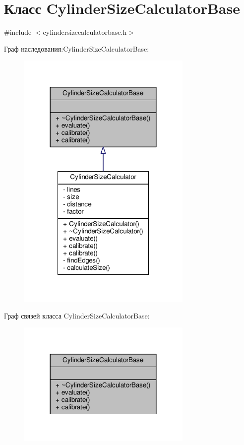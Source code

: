 \hypertarget{class_cylinder_size_calculator_base}{}\section{Класс Cylinder\+Size\+Calculator\+Base}
\label{class_cylinder_size_calculator_base}


{\ttfamily \#include $<$cylindersizecalculatorbase.\+h$>$}



Граф наследования\+:Cylinder\+Size\+Calculator\+Base\+:
\nopagebreak
\begin{figure}[H]
\begin{center}
\leavevmode
\includegraphics[width=240pt]{de/d05/class_cylinder_size_calculator_base__inherit__graph}
\end{center}
\end{figure}


Граф связей класса Cylinder\+Size\+Calculator\+Base\+:
\nopagebreak
\begin{figure}[H]
\begin{center}
\leavevmode
\includegraphics[width=240pt]{d3/dc3/class_cylinder_size_calculator_base__coll__graph}
\end{center}
\end{figure}
